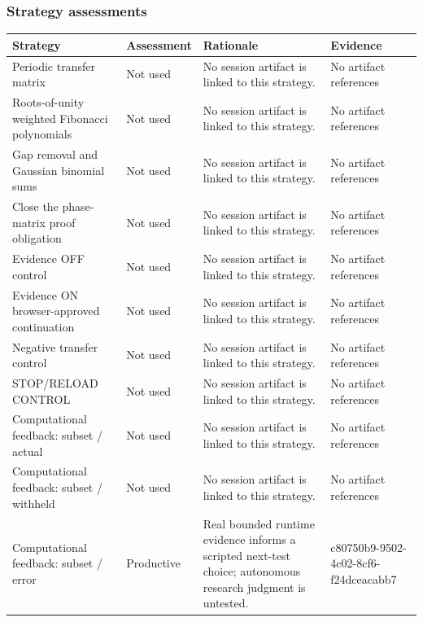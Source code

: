 \documentclass[11pt]{article}
\begin{document}
\subsubsection*{Strategy assessments}
\begin{longtable}{>{\raggedright\arraybackslash}p{.16\linewidth}>{\raggedright\arraybackslash}p{.15\linewidth}>{\raggedright\arraybackslash}p{.40\linewidth}>{\raggedright\arraybackslash}p{.17\linewidth}}
\toprule Strategy & Assessment & Rationale & Evidence \\
\midrule\endhead
Periodic transfer matrix & Not used & No session artifact is linked to this strategy. & No artifact references \\
Roots-of-unity weighted Fibonacci polynomials & Not used & No session artifact is linked to this strategy. & No artifact references \\
Gap removal and Gaussian binomial sums & Not used & No session artifact is linked to this strategy. & No artifact references \\
Close the phase-matrix proof obligation & Not used & No session artifact is linked to this strategy. & No artifact references \\
Evidence OFF control & Not used & No session artifact is linked to this strategy. & No artifact references \\
Evidence ON browser-approved continuation & Not used & No session artifact is linked to this strategy. & No artifact references \\
Negative transfer control & Not used & No session artifact is linked to this strategy. & No artifact references \\
STOP/RELOAD CONTROL & Not used & No session artifact is linked to this strategy. & No artifact references \\
Computational feedback: subset / actual & Not used & No session artifact is linked to this strategy. & No artifact references \\
Computational feedback: subset / withheld & Not used & No session artifact is linked to this strategy. & No artifact references \\
Computational feedback: subset / error & Productive & Real bounded runtime evidence informs a scripted next-test choice; autonomous research judgment is untested. & c80750b9-9502-4c02-8cf6-f24dceacabb7 \\
\bottomrule
\end{longtable}
\end{document}
